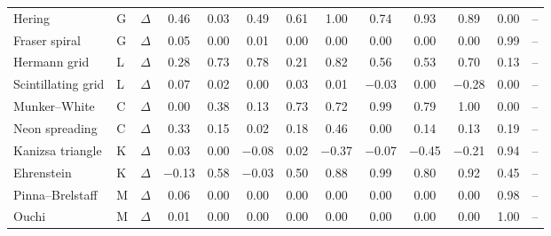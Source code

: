 \begin{tabular}{llccccccccccc}
Hering & G & $\Delta$ & 0.46 & 0.03 & 0.49 & 0.61 & 1.00 & 0.74 & 0.93 & 0.89 & 0.00 & -- \\
Fraser spiral & G & $\Delta$ & 0.05 & 0.00 & 0.01 & 0.00 & 0.00 & 0.00 & 0.00 & 0.00 & 0.99 & -- \\
Hermann grid & L & $\Delta$ & 0.28 & 0.73 & 0.78 & 0.21 & 0.82 & 0.56 & 0.53 & 0.70 & 0.13 & -- \\
Scintillating grid & L & $\Delta$ & 0.07 & 0.02 & 0.00 & 0.03 & 0.01 & $-$0.03 & 0.00 & $-$0.28 & 0.00 & -- \\
Munker--White & C & $\Delta$ & 0.00 & 0.38 & 0.13 & 0.73 & 0.72 & 0.99 & 0.79 & 1.00 & 0.00 & -- \\
Neon spreading & C & $\Delta$ & 0.33 & 0.15 & 0.02 & 0.18 & 0.46 & 0.00 & 0.14 & 0.13 & 0.19 & -- \\
Kanizsa triangle & K & $\Delta$ & 0.03 & 0.00 & $-$0.08 & 0.02 & $-$0.37 & $-$0.07 & $-$0.45 & $-$0.21 & 0.94 & -- \\
Ehrenstein & K & $\Delta$ & $-$0.13 & 0.58 & $-$0.03 & 0.50 & 0.88 & 0.99 & 0.80 & 0.92 & 0.45 & -- \\
Pinna--Brelstaff & M & $\Delta$ & 0.06 & 0.00 & 0.00 & 0.00 & 0.00 & 0.00 & 0.00 & 0.00 & 0.98 & -- \\
Ouchi & M & $\Delta$ & 0.01 & 0.00 & 0.00 & 0.00 & 0.00 & 0.00 & 0.00 & 0.00 & 1.00 & -- \\
\bottomrule
\end{tabular}
